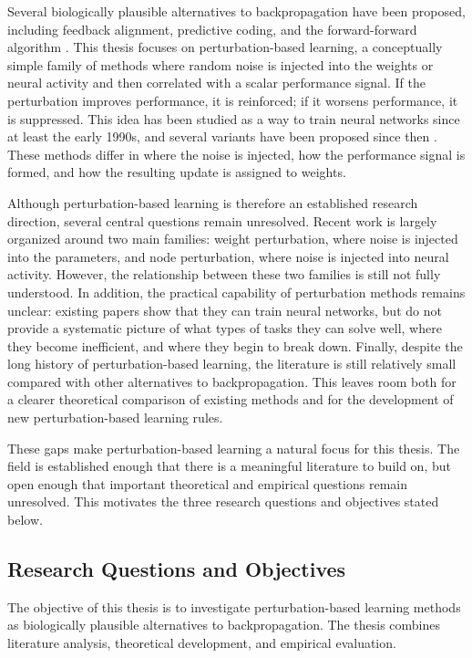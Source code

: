 Several biologically plausible alternatives to backpropagation have been proposed, including feedback alignment, predictive coding, and the forward-forward algorithm \parencite{lillicrap_random_2016,nokland_direct_2016,rao_predictive_1999,whittington_approximation_2017,hinton_forward-forward_2022}. This thesis focuses on perturbation-based learning, a conceptually simple family of methods where random noise is injected into the weights or neural activity and then correlated with a scalar performance signal. If the perturbation improves performance, it is reinforced; if it worsens performance, it is suppressed. This idea has been studied as a way to train neural networks since at least the early 1990s, and several variants have been proposed since then \parencite{widrow_30_1990,flower_summed_1992,williams_simple_1992,werfel_learning_2003}. These methods differ in where the noise is injected, how the performance signal is formed, and how the resulting update is assigned to weights.

Although perturbation-based learning is therefore an established research direction, several central questions remain unresolved. Recent work is largely organized around two main families: weight perturbation, where noise is injected into the parameters, and node perturbation, where noise is injected into neural activity. However, the relationship between these two families is still not fully understood. In addition, the practical capability of perturbation methods remains unclear: existing papers show that they can train neural networks, but do not provide a systematic picture of what types of tasks they can solve well, where they become inefficient, and where they begin to break down. Finally, despite the long history of perturbation-based learning, the literature is still relatively small compared with other alternatives to backpropagation. This leaves room both for a clearer theoretical comparison of existing methods and for the development of new perturbation-based learning rules.

These gaps make perturbation-based learning a natural focus for this thesis. The field is established enough that there is a meaningful literature to build on, but open enough that important theoretical and empirical questions remain unresolved. This motivates the three research questions and objectives stated below.
\subsection{Research Questions and Objectives}
The objective of this thesis is to investigate perturbation-based learning methods as biologically plausible alternatives to backpropagation. The thesis combines literature analysis, theoretical development, and empirical evaluation.

